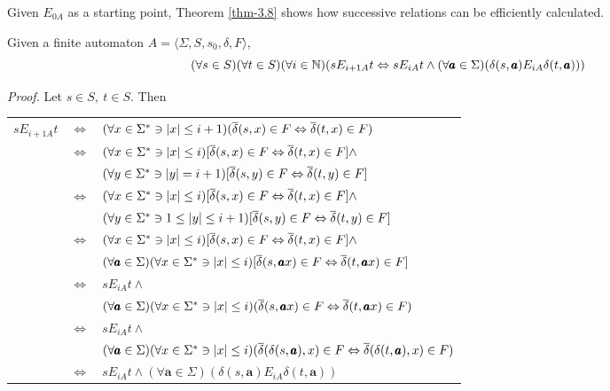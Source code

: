 Given $E_{0A}$ as a starting point, Theorem \ref{thm-3.8} shows how successive relations
can be efficiently calculated.

\begin{thm}\label{thm-3.8}
Given a finite automaton $A =\langle\Sigma,S,s_0,\delta,F\rangle$,
\[(\forall s\in S)(\forall t\in S)(\forall i \in\mathbb{N})(s E_{i+1A} t\Leftrightarrow
s E_{iA} t \wedge (\forall \pmb{a} \in \Sigma)(\delta(s,\pmb{a})E_{iA}\delta(t,\pmb{a}))) \]

\emph{Proof.} Let $s \in S,\ t \in S$. Then
\begin{center}
\begin{tabular}{rcl}
$s E_{i+1A} t$ & $\Leftrightarrow$ & $(\forall x \in \Sigma^* \ni |x| \leq i+1)
(\overline{\delta}(s,x) \in F \Leftrightarrow \overline{\delta}(t,x) \in F)$ \\
& $\Leftrightarrow$ & $(\forall x \in \Sigma^* \ni |x| \leq i)[\overline{\delta}(s,x) \in F
\Leftrightarrow \overline{\delta}(t,x) \in F] \wedge$ \\
&& $(\forall y \in \Sigma^* \ni |y| = i+1)[\overline{\delta}(s,y) \in F \Leftrightarrow
\overline{\delta}(t,y) \in F]$ \\
& $\Leftrightarrow$ & $(\forall x \in \Sigma^* \ni |x| \leq i)[\overline{\delta}(s,x) \in F
\Leftrightarrow \overline{\delta}(t,x) \in F] \wedge$ \\
&& $(\forall y \in \Sigma^* \ni 1 \leq |y| \leq i+1)[\overline{\delta}(s,y)\in F
\Leftrightarrow \overline{\delta}(t,y)\in F]$ \\
& $\Leftrightarrow$ & $(\forall x \in \Sigma^* \ni |x| \leq i)[\overline{\delta}(s,x) \in F
\Leftrightarrow \overline{\delta}(t,x) \in F] \wedge$ \\
&& $(\forall \pmb{a} \in \Sigma)(\forall x \in \Sigma^* \ni |x| \leq i)[\overline{\delta}(s,\pmb{a}x)
\in F \Leftrightarrow \overline{\delta}(t,\pmb{a}x) \in F]$ \\
& $\Leftrightarrow$ & $s E_{iA} t \wedge$ \\
&& $(\forall \pmb{a} \in \Sigma)(\forall x \in \Sigma^* \ni |x| \leq i)(\overline{\delta}(s,\pmb{a}x)
\in F \Leftrightarrow \overline{\delta}(t,\pmb{a}x) \in F)$ \\
& $\Leftrightarrow$ & $s E_{iA} t \wedge$ \\
&& $(\forall \pmb{a} \in \Sigma)(\forall x \in \Sigma^* \ni |x| \leq i)
(\overline{\delta}(\delta(s,\pmb{a}),x) \in F \Leftrightarrow \overline{\delta}(\delta(t,\pmb{a}),x) \in F)$ \\
& $\Leftrightarrow$ & $s E_{iA} t \wedge (\forall \pmb{a} \in \Sigma)(\delta(s,\pmb{a})
E_{iA} \delta(t,\pmb{a}))$
\end{tabular}
\end{center}
\end{thm}

